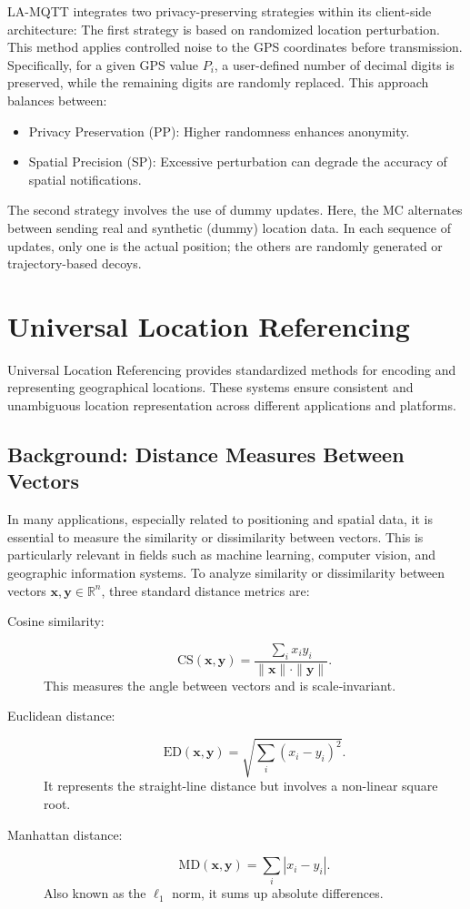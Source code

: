 LA-MQTT integrates two privacy-preserving strategies within its client-side architecture:
The first strategy is based on randomized location perturbation. This method applies controlled noise to the GPS coordinates before transmission. Specifically, for a given GPS value $P_i$, a user-defined number of decimal digits is preserved, while the remaining digits are randomly replaced. This approach balances between:
\begin{itemize}
    \item Privacy Preservation (PP): Higher randomness enhances anonymity.
    \item Spatial Precision (SP): Excessive perturbation can degrade the accuracy of spatial notifications.
\end{itemize}
The second strategy involves the use of dummy updates. Here, the MC alternates between sending real and synthetic (dummy) location data. In each sequence of updates, only one is the actual position; the others are randomly generated or trajectory-based decoys.

\section{Universal Location Referencing}
Universal Location Referencing provides standardized methods for encoding and representing geographical locations. These systems ensure consistent and unambiguous location representation across different applications and platforms.

\subsection{Background: Distance Measures Between Vectors}
\label{sec:background-distances}

In many applications, especially related to positioning and spatial data, it is essential to measure the similarity or dissimilarity between vectors. This is particularly relevant in fields such as machine learning, computer vision, and geographic information systems. To analyze similarity or dissimilarity between vectors $\mathbf{x}, \mathbf{y} \in \mathbb{R}^n$, three standard distance metrics are:

\begin{description}
  \item[Cosine similarity:]
  \[
    \mathrm{CS}(\mathbf{x}, \mathbf{y}) 
    = \frac{\sum_i x_i y_i}{\|\mathbf{x}\| \cdot \|\mathbf{y}\|}.
  \]
  This measures the angle between vectors and is scale‑invariant.

  \item[Euclidean distance:]
  \[
    \mathrm{ED}(\mathbf{x}, \mathbf{y}) 
    = \sqrt{\sum_i (x_i - y_i)^2}.
  \]
  It represents the straight-line distance but involves a non-linear square root.

  \item[Manhattan distance:]
  \[
    \mathrm{MD}(\mathbf{x}, \mathbf{y}) 
    = \sum_i |x_i - y_i|.
  \]
  Also known as the $\ell_1$ norm, it sums up absolute differences.
\end{description}
